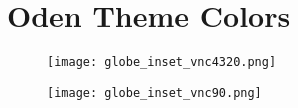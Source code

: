 \documentclass[10pt, aspectratio=169]{oden_beamer}
\begin{document}
\section{Oden Theme Colors} %
\begin{frame}
    \begin{figure}
        \centering
        \begin{minipage}{.5\textwidth}
          \centering
          \texttt{[image: globe\_inset\_vnc4320.png]}
          \label{fig:test1}
        \end{minipage}%
        \begin{minipage}{.5\textwidth}
          \centering
          \texttt{[image: globe\_inset\_vnc90.png]}
          \label{fig:test2}
        \end{minipage}
        \end{figure}
\end{frame}
\end{document}
